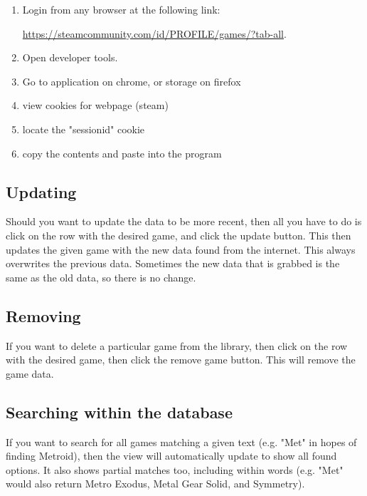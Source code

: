 \begin{enumerate}
	\item Login from any browser at the following link:

		\href{https://steamcommunity.com/id/PROFILE/games/?tab-all}{https://steamcommunity.com/id/PROFILE/games/?tab-all}.
	\item Open developer tools.
	\item Go to application on chrome, or storage on firefox
	\item view cookies for webpage (steam)
	\item locate the "sessionid" cookie
	\item copy the contents and paste into the program
\end{enumerate}

\subsection{Updating}
\label{subsec:Updating}

Should you want to update the data to be more recent, then all you
have to do is click on the row with the desired game, and click the
update button. This then updates the given game with the new data
found from the internet. This always overwrites the previous data.
Sometimes the new data that is grabbed is the same as the old data,
so there is no change.


\subsection{Removing}

If you want to delete a particular game from the library, then click
on the row with the desired game, then click the remove game button.
This will remove the game data.


\subsection{Searching within the database}

If you want to search for all games matching a given text (e.g.
"Met" in hopes of finding Metroid), then the view will automatically
update to show all found options. It also shows partial matches too,
including within words (e.g. "Met" would also return Metro Exodus,
Metal Gear Solid, and Symmetry).

